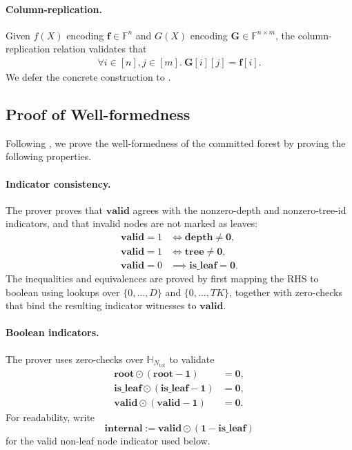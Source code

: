 \paragraph{Column-replication.}
Given $f(X)$ encoding $\mathbf{f}\in \mathbb{F}^{n}$
    and $G(X)$ encoding $\mathbf{G}\in \mathbb{F}^{n\times m}$,
    the column-replication relation validates that 
    \begin{align}
        \forall i\in [n], j\in [m].\ \mathbf{G}[i][j] = \mathbf{f}[i].
    \end{align}
    We defer the concrete construction to .

\subsection{Proof of Well-formedness}

Following ,
    we prove the well-formedness of the committed forest by proving the following properties.

\paragraph{Indicator consistency.}
The prover proves that $\mathbf{valid}$ agrees with the nonzero-depth and
nonzero-tree-id indicators, and that invalid nodes are not marked as leaves:
\begin{align}
    \mathbf{valid}=1 &\iff \mathbf{depth} \neq \mathbf{0},\\
    \mathbf{valid}=1 &\iff \mathbf{tree} \neq \mathbf{0},\\
    \mathbf{valid}=0 &\implies \mathbf{is\_leaf} = \mathbf{0}.
\end{align}
The inequalities and equivalences are proved by 
first mapping the RHS to boolean using lookups over
$\{0,\ldots,D\}$ and $\{0,\ldots,TK\}$, together with zero-checks that bind the
resulting indicator witnesses to $\mathbf{valid}$.

\paragraph{Boolean indicators.}
The prover uses zero-checks over $\mathbb{H}_{N_{\mathrm{tot}}}$ to validate
\begin{align}
    \mathbf{root}\odot(\mathbf{root}-\mathbf{1}) &= \mathbf{0},\\
    \mathbf{is\_leaf}\odot(\mathbf{is\_leaf}-\mathbf{1}) &= \mathbf{0},\\
    \mathbf{valid}\odot(\mathbf{valid}-\mathbf{1}) &= \mathbf{0}.
\end{align}
For readability, write
\[
    \mathbf{internal}:=\mathbf{valid}\odot(\mathbf{1}-\mathbf{is\_leaf})
\]
for the valid non-leaf node indicator used below.

